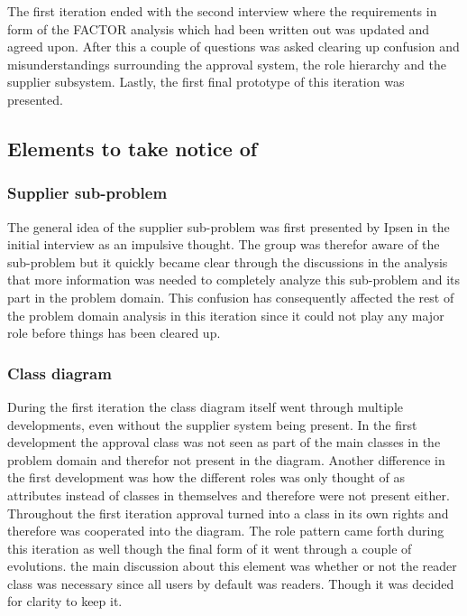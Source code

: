 The first iteration ended with the second interview where the requirements in form of the FACTOR analysis which had been written out was updated and agreed upon.
After this a couple of questions was asked clearing up confusion and misunderstandings surrounding the approval system, the role hierarchy and the supplier subsystem.
Lastly, the first final prototype of this iteration was presented.

\subsection{Elements to take notice of}
\subsubsection*{Supplier sub-problem}
The general idea of the supplier sub-problem was first presented by Ipsen in the initial interview as an impulsive thought. 
The group was therefor aware of the sub-problem but it quickly became clear through the discussions in the analysis that more information was needed to completely analyze this sub-problem and its part in the problem domain.
This confusion has consequently affected the rest of the problem domain analysis in this iteration since it could not play any major role  before things has been cleared up.

\subsubsection*{Class diagram}
During the first iteration the class diagram itself went through multiple developments, even without the supplier system being present.
In the first development the approval class was not seen as part of the main classes in the problem domain and therefor not present in the diagram.
Another difference in the first development was how the different roles was only thought of as attributes instead of classes in themselves and therefore were not present either.
Throughout the first iteration approval turned into a class in its own rights and therefore was cooperated into the diagram.
The role pattern came forth during this iteration as well though the final form of it went through a couple of evolutions.
the main discussion about this element was whether or not the reader class was necessary since all users by default was readers. 
Though it was decided for clarity to keep it.

